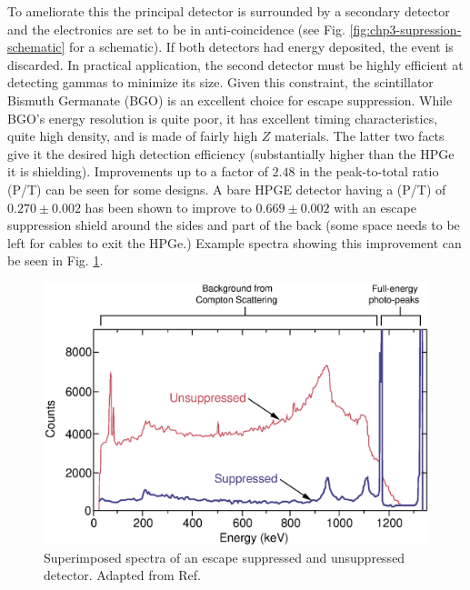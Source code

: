 To ameliorate this the principal detector is surrounded by a secondary detector and the electronics are set to be in anti-coincidence (see Fig. \ref{fig:chp3-supression-schematic} for a schematic). If both detectors had energy deposited, the event is discarded. In practical application, the second detector must be highly efficient at detecting gammas to minimize its size. Given this constraint, the scintillator Bismuth Germanate (BGO) is an excellent choice for escape suppression. While BGO's energy resolution is quite poor, it has excellent timing characteristics, quite high density, and is made of fairly high $Z$ materials. The latter two facts give it the desired high detection efficiency (substantially higher than the HPGe it is shielding). Improvements up to a factor of $2.48$ in the peak-to-total ratio (P/T) can be seen for some designs. A bare HPGE detector having a (P/T) of $0.270\pm0.002$ has been shown to improve to $0.669\pm0.002$\cite{GSComptonSuppression} with an escape suppression shield around the sides and part of the back (some space needs to be left for cables to exit the HPGe.) Example spectra showing this improvement can be seen in Fig. \ref{fig:chp3-supression-improvement}.

\begin{figure}[h!]
	\centerline{\includegraphics[height=0.25\textheight]{./img/c3/suppressed_spectra.eps}}
	\caption{Superimposed spectra of an escape suppressed and unsuppressed detector. Adapted from Ref.\cite{gsBooklet}}
	\label{fig:chp3-supression-improvement}
\end{figure}

